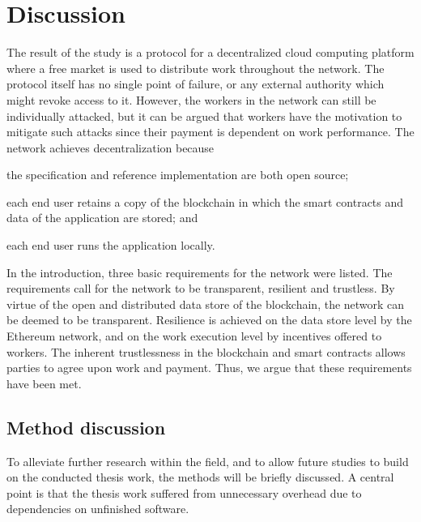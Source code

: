 \chapter{Discussion}
The result of the study is a protocol for a decentralized cloud computing platform where a free market is used to distribute work throughout the network. The protocol itself has no single point of failure, or any external authority which might revoke access to it. However, the workers in the network can still be individually attacked, but it can be argued that workers have the motivation to mitigate such attacks since their payment is dependent on work performance.
The network achieves decentralization because
\begin{inparaenum}
\item the specification and reference implementation are both open source;
\item each end user retains a copy of the blockchain in which the smart contracts and data of the application are stored; and
\item each end user runs the application locally. 
\end{inparaenum}

In the introduction, three basic requirements for the network were listed. The requirements call for the network to be transparent, resilient and trustless. By virtue of the open and distributed data store of the blockchain, the network can be deemed to be transparent. Resilience is achieved on the data store level by the Ethereum network, and on the work execution level by incentives offered to workers. The inherent trustlessness in the blockchain and smart contracts allows parties to agree upon work and payment. Thus, we argue that these requirements have been met.

\section{Method discussion}
To alleviate further research within the field, and to allow future studies to build on the conducted thesis work, the methods will be briefly discussed. A central point is that the thesis work suffered from unnecessary overhead due to dependencies on unfinished software.

